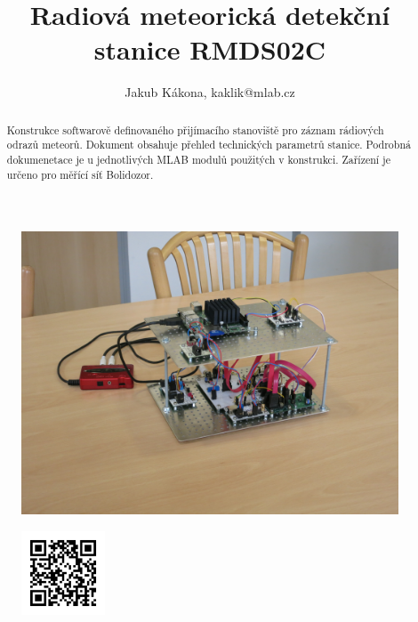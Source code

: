 \documentclass[12pt,a4paper,oneside]{article}
\begin{document}
\title{Radiová meteorická detekční stanice RMDS02C}
\author{Jakub Kákona, kaklik@mlab.cz }
\maketitle

\begin{abstract}
Konstrukce softwarově definovaného přijímacího stanoviště pro záznam rádiových odrazů meteorů. Dokument obsahuje přehled technických parametrů stanice. Podrobná dokumenetace je u jednotlivých MLAB modulů použitých v konstrukci. Zařízení je určeno pro měřící síť Bolidozor. 
\end{abstract}

\begin{figure} [htbp]
\begin{center}
\includegraphics [width=120mm] {./img/20140226_1110.JPG} 
\end{center}
\end{figure}

\begin{figure} [b]
\includegraphics [width=25mm] {./img/RMDS02C-QRcode.png} 
\end{figure}

\newpage
\tableofcontents
\end{document}
